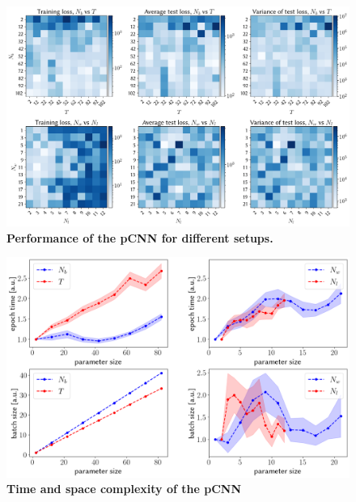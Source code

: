 \begin{figure}
	\centering
	\includegraphics[width=\linewidth]{Chapter5/Figs/Raster/avg_var_loss}
	\caption[Performance of the pCNN for different setups]{\textbf{Performance of the pCNN for different setups.}}
	\label{fig:avgvarloss}
\end{figure}

\begin{figure}
	\centering
	\includegraphics[width=\linewidth]{Chapter5/Figs/Raster/initial_time_space}
	\caption[Time and space complexity of the pCNN]{\textbf{Time and space complexity of the pCNN}}
	\label{fig:initialtimespace}
\end{figure}

